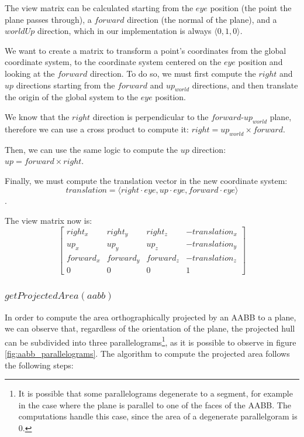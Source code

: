 \documentclass{PoliMi_MasterThesis}
\begin{document}
The view matrix can be calculated starting from the $eye$ position (the point the plane passes through), a $forward$ direction (the normal of the plane), and a $worldUp$ direction, which in our implementation is always $\langle 0, 1, 0 \rangle$.

We want to create a matrix to transform a point's coordinates from the global coordinate system, to the coordinate system centered on the $eye$ position and looking at the $forward$ direction. To do so, we must first compute the $right$ and $up$ directions starting from the $forward$ and $up_{world}$ directions, and then translate the origin of the global system to the $eye$ position.

We know that the $right$ direction is perpendicular to the $forward$-$up_{world}$ plane, therefore we can use a cross product to compute it: $right = up_{world} \times forward$.

Then, we can use the same logic to compute the $up$ direction: $up = forward \times right$.

Finally, we must compute the translation vector in the new coordinate system: $$translation = \langle right \cdot eye, up \cdot eye, forward \cdot eye \rangle$$.

The view matrix now is:
\begin{equation}
	\begin{bmatrix}
		right_x & right_y & right_z & -translation_x \\
		up_x & up_y & up_z & -translation_y \\
		forward_x & forward_y & forward_z & -translation_z \\
		0 & 0 & 0 & 1
	\end{bmatrix}
\end{equation}

\subsubsection*{$getProjectedArea(aabb)$}
In order to compute the area orthographically projected by an AABB to a plane, we can observe that, regardless of the orientation of the plane, the projected hull can be subdivided into three parallelograms\footnote{It is possible that some parallelograms degenerate to a segment, for example in the case where the plane is parallel to one of the faces of the AABB. The computations handle this case, since the area of a degenerate parallelgoram is 0.}, as it is possible to observe in figure \ref{fig:aabb_parallelograms}. The algorithm to compute the projected area follows the following steps:
\end{document}

